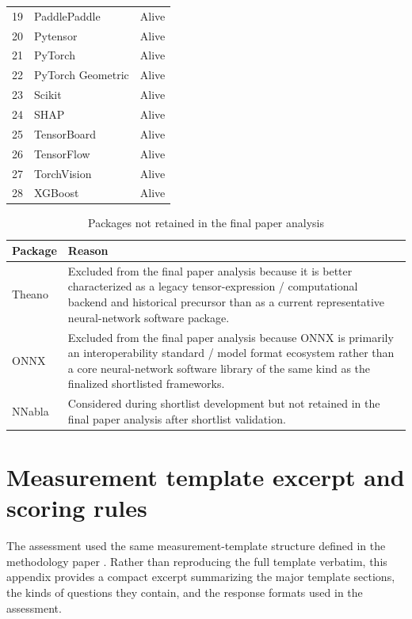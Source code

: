 \documentclass[final,1p,times,authoryear,12pt]{elsarticle}
\providecommand{\wss}[1]{\textcolor{blue}{\textit{#1}}}
\begin{document}
\begin{table}[H]
\begin{tabular}{r l l}
19 & PaddlePaddle              & Alive \\
20 & Pytensor                  & Alive \\
21 & PyTorch                   & Alive \\
22 & PyTorch Geometric         & Alive \\
23 & Scikit                    & Alive \\
24 & SHAP                      & Alive \\
25 & TensorBoard               & Alive \\
26 & TensorFlow                & Alive \\
27 & TorchVision               & Alive \\
28 & XGBoost                   & Alive \\
\bottomrule
\end{tabular}
\end{table}

\begin{table}[H]
\centering
\caption{Packages not retained in the final paper analysis}
\label{tab:excluded-packages}
\begin{tabular}{l p{}}
\toprule
\textbf{Package} & \textbf{Reason} \\
\midrule
Theano & Excluded from the final paper analysis because it is better characterized as a legacy tensor-expression / computational backend and historical precursor than as a current representative neural-network software package. \\

ONNX & Excluded from the final paper analysis because ONNX is primarily an interoperability standard / model format ecosystem rather than a core neural-network software library of the same kind as the finalized shortlisted frameworks. \\

NNabla & Considered during shortlist development but not
retained in the final paper analysis after shortlist
validation. \\
\bottomrule
\end{tabular}
\end{table}

\section{Measurement template excerpt and scoring rules}\label{app-template}
The assessment used the same measurement-template structure
defined in the methodology paper \cite{MethodologyPaper}.
Rather than reproducing the full template verbatim, this
appendix provides a compact excerpt summarizing the major
template sections, the kinds of questions they contain, and
the response formats used in the assessment.
\end{document}
